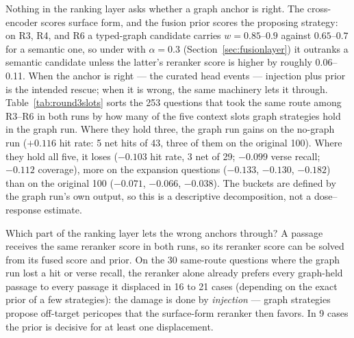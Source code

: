 Nothing in the ranking layer asks whether a graph anchor is right. The
cross-encoder scores surface form, and the fusion prior scores the
proposing strategy: on R3, R4, and R6 a typed-graph candidate carries
$w=0.85$--$0.9$ against $0.65$--$0.7$ for a semantic one, so under
\fusedeq with $\alpha=0.3$ (Section~\ref{sec:fusionlayer}) it outranks a
semantic candidate unless the latter's reranker score is higher by
roughly 0.06--0.11. When the anchor is right --- the curated head events
--- injection plus prior is the intended rescue; when it is wrong, the
same machinery lets it through. Table~\ref{tab:round3slots} sorts the
253 questions that took the same route among R3--R6 in both runs by how
many of the five context slots graph strategies hold in the graph run.
Where they hold three, the graph run gains on the no-graph run
($+0.116$ hit rate: 5 net hits of 43, three of them on the original
100). Where they hold all five, it loses ($-0.103$ hit rate, 3 net of
29; $-0.099$ verse recall; $-0.112$ coverage), more on the expansion
questions ($-0.133$, $-0.130$, $-0.182$) than on the original 100
($-0.071$, $-0.066$, $-0.038$). The buckets are defined by the graph
run's own output, so this is a descriptive decomposition, not a
dose--response estimate.

Which part of the ranking layer lets the wrong anchors through? A
passage receives the same reranker score in both runs, so its reranker
score can be solved from its fused score and prior. On the 30
same-route questions where the graph run lost a hit or verse recall,
the reranker alone already prefers every graph-held passage to every
passage it displaced in 16 to 21 cases (depending on the exact prior of
a few strategies): the damage is done by \emph{injection} --- graph
strategies propose off-target pericopes that the surface-form reranker
then favors. In 9 cases the prior is decisive for at least one
displacement.

